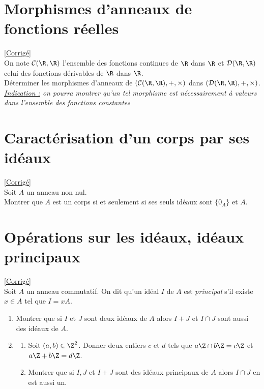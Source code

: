 \documentclass[8pt]{book}
\begin{document}
	\section{Morphismes d'anneaux de fonctions réelles}
	\label{Morphismes d'anneaux de fonctions réelles}
	\textcolor{blue}{\hyperref[Morphismes d'anneaux de fonctions réelles corrigé]{[Corrigé]}}\\
	On note $\mathcal C(\R,\R)$ l'ensemble des fonctions continues de $\R$ dans $\R$ et $\mathcal D(\R,\R)$ celui des fonctions dérivables de $\R$ dans $\R$.\\
	Déterminer les morphismes d'anneaux de $(\mathcal C(\R,\R),+,\times)$ dans $(\mathcal D(\R,\R),+,\times)$.\\
	\textit{\underline{Indication :} on pourra montrer qu'un tel morphisme est nécessairement à valeurs dans l'ensemble des fonctions constantes}
	
	\section{Caractérisation d'un corps par ses idéaux }
	\label{Caractérisation d'un corps par ses idéaux}
	\textcolor{blue}{\hyperref[Caractérisation d'un corps par ses idéaux corrigé]{[Corrigé]}}\\
	Soit $A$ un anneau non nul.\\
	Montrer que $A$ est un corps si et seulement si ses seuls idéaux sont $\{0_A\}$ et $A$.
	
	\section{Opérations sur les idéaux, idéaux principaux }
	\label{Opérations sur les idéaux, idéaux principaux}
	\textcolor{blue}{\hyperref[Opérations sur les idéaux, idéaux principaux corrigé]{[Corrigé]}}\\
	Soit $A$ un anneau commutatif. On dit qu'un idéal $I$ de $A$ est \textit{principal} s'il existe $x\in A$ tel que $I=xA$.
	\begin{enumerate}
		\item Montrer que si $I$ et $J$ sont deux idéaux de $A$ alors $I+J$ et $I\cap J$ sont aussi des idéaux de $A$.
		\item
		\begin{enumerate}[label=\alph*.]
			\item Soit $(a,b)\in \Z^2$. Donner deux entiers $c$ et $d$ tels que $a\Z\cap b\Z=c\Z$ et $a\Z+b\Z=d\Z$.
			\item Montrer que si $I,J$ et $I+J$ sont des idéaux principaux de $A$ alors $I\cap J$ en est aussi un.
		\end{enumerate}
	\end{enumerate}
	
\end{document}
